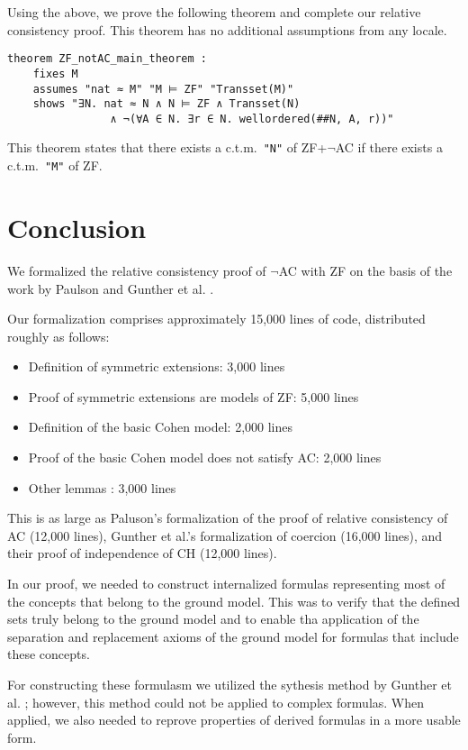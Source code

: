 \documentclass{report}
\newenvironment{isaframe}{\begin{mdframed}[topline=false, rightline=false, bottomline=false]}{\end{mdframed}}
\begin{document}
Using the above, we prove the following theorem and complete our relative consistency proof.
This theorem has no additional assumptions from any locale.
\begin{isaframe}
\begin{verbatim}
theorem ZF_notAC_main_theorem :
    fixes M 
    assumes "nat ≈ M" "M ⊨ ZF" "Transset(M)" 
    shows "∃N. nat ≈ N ∧ N ⊨ ZF ∧ Transset(N) 
                ∧ ¬(∀A ∈ N. ∃r ∈ N. wellordered(##N, A, r))" 
\end{verbatim}
\end{isaframe}
This theorem states that there exists a c.t.m.\ \texttt{"N"} of ZF+$\neg$AC if there exists a c.t.m.\ \texttt{"M"} of ZF.




\chapter{Conclusion}

We formalized the relative consistency proof of $\neg$AC with ZF
on the basis of the work by Paulson \cite{paulson_AC_consistency} and Gunther et al. \cite{gunther_forcing}.

Our formalization comprises approximately 15,000 lines of code, 
distributed roughly as follows:
\begin{itemize}
  \item Definition of symmetric extensions: 3,000 lines
  \item Proof of symmetric extensions are models of ZF: 5,000 lines
  \item Definition of the basic Cohen model: 2,000 lines
  \item Proof of the basic Cohen model does not satisfy AC: 2,000 lines
  \item Other lemmas : 3,000 lines
\end{itemize}
This is as large as Paluson's formalization of the proof of relative consistency of AC (12,000 lines), 
Gunther et al.'s formalization of coercion (16,000 lines), 
and their proof of independence of CH (12,000 lines).

In our proof, we needed to construct internalized formulas 
representing most of the concepts that belong to the ground model. 
This was to verify that the defined sets truly belong to the ground model 
and to enable tha application of the separation and replacement axioms of the ground model for formulas that include these concepts.

For constructing these formulasm we utilized the sythesis method by Gunther et al. \cite{gunther_forcing};
however, this method could not be applied to complex formulas.
When applied, we also needed to reprove properties of derived formulas in a more usable form.
\end{document}

